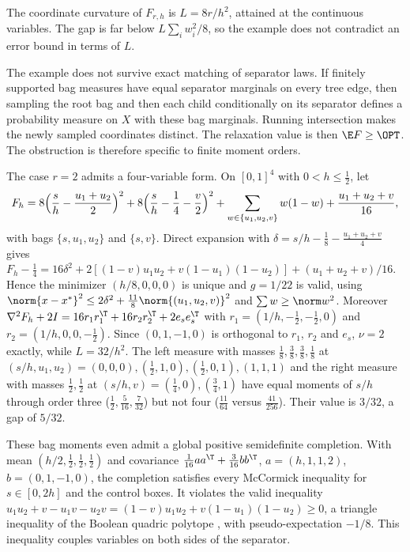 \begin{remark}
\label{lim:rem:moments}
The coordinate curvature of $F_{r,h}$ is $L=8r/h^2$, attained at the continuous variables. The
gap is far below $L\sum_iw_i^2/8$, so the example does not contradict an
error bound in terms of $L$.

The example does not survive exact matching of separator laws. If finitely
supported bag measures have equal separator marginals on every tree edge,
then sampling the root bag and then each child conditionally on its separator
defines a probability measure on $X$ with these bag marginals. Running
intersection makes the newly sampled coordinates distinct. The relaxation
value is then $\E F\ge\OPT$. The obstruction is therefore specific to finite
moment orders.

The case $r=2$ admits a four-variable form. On $[0,1]^4$ with
$0<h\le\frac12$, let
\[
F_h=8\Bigl(\frac sh-\frac{u_1+u_2}2\Bigr)^2+8\Bigl(\frac sh-\frac14-\frac v2
\Bigr)^2+\sum_{w\in\{u_1,u_2,v\}}w(1-w)+\frac{u_1+u_2+v}{16},
\]
with bags $\{s,u_1,u_2\}$ and $\{s,v\}$. Direct expansion with
$\delta=s/h-\frac18-\frac{u_1+u_2+v}4$ gives
$F_h-\frac14=16\delta^2+2[(1-v)u_1u_2+v(1-u_1)(1-u_2)]+(u_1+u_2+v)/16$.
Hence the minimizer $(h/8,0,0,0)$ is unique and $g=1/22$ is valid, using
$\norm{x-x^*}^2\le2\delta^2+\frac{11}8\norm{(u_1,u_2,v)}^2$ and
$\sum w\ge\norm w^2$. Moreover $\nabla^2F_h+2I=16r_1r_1^{\T}+
16r_2r_2^{\T}+2e_se_s^{\T}$ with $r_1=(1/h,-\frac12,-\frac12,0)$
and $r_2=(1/h,0,0,-\frac12)$. Since $(0,1,-1,0)$ is orthogonal to $r_1$, $r_2$
and $e_s$, $\nu=2$ exactly, while $L=32/h^2$. The left measure with masses
$\frac18,\frac38,\frac38,\frac18$ at $(s/h,u_1,u_2)=(0,0,0),(\frac12,1,0),
(\frac12,0,1),(1,1,1)$ and the right measure with masses $\frac12,\frac12$
at $(s/h,v)=(\frac14,0),(\frac34,1)$ have equal moments of $s/h$ through order
three ($\frac12,\frac5{16},\frac7{32}$) but not four ($\frac{11}{64}$ versus
$\frac{41}{256}$). Their value is $3/32$, a gap of $5/32$.

These bag moments even admit a global positive semidefinite completion.
With mean $(h/2,\frac12,\frac12,\frac12)$ and covariance
$\frac1{16}aa^{\T}+\frac3{16}bb^{\T}$, $a=(h,1,1,2)$,
$b=(0,1,-1,0)$, the completion satisfies every McCormick inequality for
$s\in[0,2h]$ and the control boxes. It violates the valid inequality
$u_1u_2+v-u_1v-u_2v=(1-v)u_1u_2+v(1-u_1)(1-u_2)\ge0$, a triangle inequality
of the Boolean quadric polytope \cite{Padberg1989}, with pseudo-expectation
$-1/8$. This inequality couples variables on both sides of the separator.
\end{remark}

